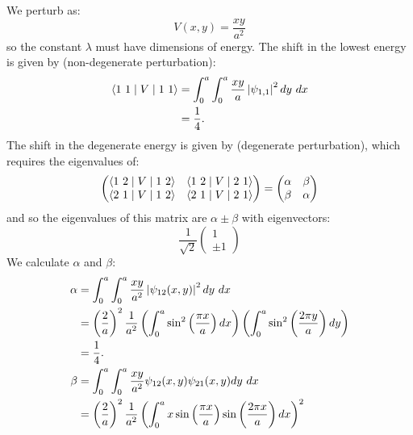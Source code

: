 \documentclass[../Main.tex]{subfiles}
\begin{document}
\begin{example}
    We perturb as:
    \begin{equation*}
        V(x, y) = \frac{xy}{a^2}
    \end{equation*}
    so the constant $\lambda$ must have dimensions of energy. The shift in the lowest energy is given by  (non-degenerate perturbation):
    \begin{align*}
        \langle1~1\mid V\mid1~1\rangle &= \int_{0}^{a} \int_{0}^{a} \frac{xy}{a} \left|\psi_{1, 1}\right|^2 dy~ dx  \\
        &= \frac14.
    \end{align*}
    The shift in the degenerate energy is given by  (degenerate perturbation), which requires the eigenvalues of:
    \begin{equation*}
        \begin{pmatrix}
            \langle1~2\mid V\mid1~2\rangle & \langle1~2\mid V\mid2~1\rangle \\
            \langle2~1\mid V\mid1~2\rangle & \langle2~1\mid V\mid2~1\rangle
        \end{pmatrix}
        =
        \begin{pmatrix}
            \alpha & \beta \\
            \beta & \alpha
        \end{pmatrix}
    \end{equation*}
    and so the eigenvalues of this matrix are $\alpha \pm \beta$ with eigenvectors:
    \begin{equation*}
        \frac{1}{\sqrt{2}} \begin{pmatrix}1 \\ \pm1 \end{pmatrix}
    \end{equation*}
    We calculate $\alpha$ and $\beta$:
    \begin{align*}
        \alpha &= \int_{0}^{a} \int_{0}^{a} \frac{xy}{a^2}\abs{\psi_{12}(x, y)}^2 dy~dx \\
        &= \left(\frac{2}{a}\right)^2 \frac{1}{a^2} \left(\int_{0}^{a} \sin^2 \left(\frac{\pi x}{a}\right) dx\right) \left(\int_{0}^{a} \sin^2 \left(\frac{2\pi y}{a}\right) dy \right) \\
        &= \frac14. \\
        \beta &= \int_{0}^{a} \int_{0}^{a} \frac{xy}{a^2}\psi_{12}(x, y)\psi_{21}(x, y) dy~dx \\
        &= \left(\frac{2}{a}\right)^2 \frac{1}{a^2} \left(\int_{0}^{a} x\sin\left(\frac{\pi x}{a}\right)\sin \left(\frac{2\pi x}{a}\right) dx\right)^2 \\

\end{align*}
\end{example}
\end{document}
